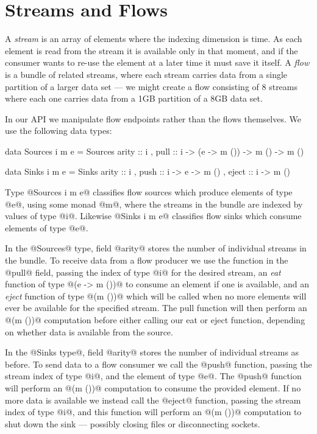 
\section{Streams and Flows}

A \emph{stream} is an array of elements where the indexing dimension is time. As each element is read from the stream it is available only in that moment, and if the consumer wants to re-use the element at a later time it must save it itself. A \emph{flow} is a bundle of related streams, where each stream carries data from a single partition of a larger data set --- we might create a flow consisting of 8 streams where each one carries data from a 1GB partition of a 8GB data set.

\eject
In our API we manipulate flow endpoints rather than the flows themselves. We use the following data types:

\begin{code}
data Sources i m e 
   = Sources
   { arity :: i
   , pull  :: i -> (e -> m ()) -> m () -> m () }

data Sinks   i m e 
   = Sinks   
   { arity :: i
   , push  :: i -> e -> m ()
   , eject :: i -> m () }
\end{code}

Type @Sources i m e@ classifies flow sources which produce elements of type @e@, using some monad @m@, where the streams in the bundle are indexed by values of type @i@. Likewise @Sinks i m e@ classifies flow sinks which consume elements of type @e@.

In the @Sources@ type, field @arity@ stores the number of individual streams in the bundle. To receive data from a flow producer we use the function in the @pull@ field, passing the index of type @i@ for the desired stream, an \emph{eat} function of type @(e -> m ())@ to consume an element if one is available, and an \emph{eject} function of type @(m ())@ which will be called when no more elements will ever be available for the specified stream. The pull function will then perform an @(m ())@ computation before either calling our eat or eject function, depending on whether data is available from the source.

In the @Sinks type@, field @arity@ stores the number of individual streams as before. To send data to a flow consumer we call the @push@ function, passing the stream index of type @i@, and the element of type @e@. The @push@ function will perform an @(m ())@ computation to consume the provided element. If no more data is available we instead call the @eject@ function, passing the stream index of type @i@, and this function will perform an @(m ())@ computation to shut down the sink --- possibly closing files or disconnecting sockets.

